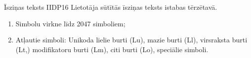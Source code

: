 \parameterTable
{Īsziņas teksts}
{IIDP16}
{
	Lietotāja sūtītās īsziņas teksts istabas tērzētavā.
}
{
	\begin{enumerate}
		\item Simbolu virkne līdz 2047 simboliem;
		\item Atļautie simboli: Unikoda lielie burti (Lu), mazie burti (Ll), virsraksta burti (Lt,) modifikatoru burti (Lm), citi burti (Lo), speciālie simboli.
	\end{enumerate}
}
{
}
